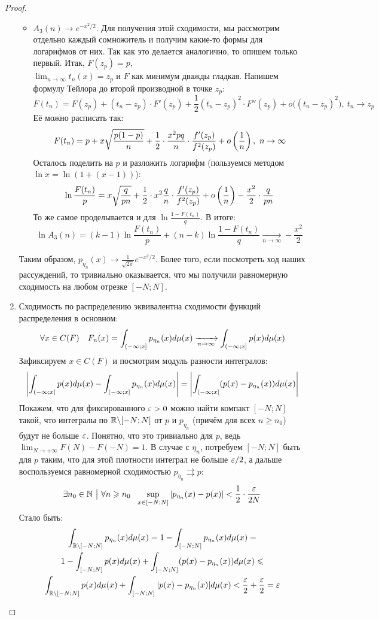 \begin{proof}
\begin{enumerate}
\begin{itemize}
			\item $A_3(n) \to e^{-x^2 / 2}$. Для получения этой сходимости, мы рассмотрим отдельно каждый сомножитель и получим какие-то формы для логарифмов от них. Так как это делается аналогично, то опишем только первый. Итак, $F(z_p) = p$,\\ $\lim_{n \to \infty} t_n(x) = z_p$ и $F$ как минимум дважды гладкая. Напишем формулу Тейлора до второй производной в точке $z_p$:
			\[
				F(t_n) = F(z_p) + (t_n - z_p) \cdot F'(z_p) + \frac{1}{2}(t_n - z_p)^2 \cdot F''(z_p) + o\big((t_n - z_p)^2\big),\ t_n \to z_p
			\]
			Её можно расписать так:
			\[
				F(t_n) = p + x\sqrt{\frac{p(1 - p)}{n}} + \frac{1}{2} \cdot \frac{x^2pq}{n} \cdot \frac{f'(z_p)}{f^2(z_p)} + o\left(\frac{1}{n}\right),\ n \to \infty
			\]
			Осталось поделить на $p$ и разложить логарифм (пользуемся методом $\ln x = \ln(1 + (x - 1))$):
			\[
				\ln \frac{F(t_n)}{p} = x\sqrt{\frac{q}{pn}} + \frac{1}{2} \cdot x^2\frac{q}{n} \cdot \frac{f'(z_p)}{f^2(z_p)} + o\left(\frac{1}{n}\right) - \frac{x^2}{2} \cdot \frac{q}{pn}
			\]
			То же самое проделывается и для $\ln \frac{1 - F(t_n)}{q}$. В итоге:
			\[
				\ln A_3(n) = (k - 1)\ln \frac{F(t_n)}{p} + (n - k)\ln \frac{1 - F(t_n)}{q} \xrightarrow[n \to \infty]{} -\frac{x^2}{2}
			\]
		\end{itemize}
		Таким образом, $p_{\eta_n}(x) \to \frac{1}{\sqrt{2\pi}} e^{-x^2 / 2}$. Более того, если посмотреть ход наших рассуждений, то тривиально оказывается, что мы получили равномерную сходимость на любом отрезке $[-N; N]$.
		
		\item Сходимость по распределению эквивалентна сходимости функций распределения в основном:
		\[
			\forall x \in C(F)\quad F_n(x) = \int_{\left(-\infty; x\right]} p_{\eta_n}(x)d\mu(x) \xrightarrow[n \to \infty]{} \int_{\left(-\infty; x\right]} p(x)d\mu(x)
		\]
		Зафиксируем $x \in C(F)$ и посмотрим модуль разности интегралов:
		\[
			\left|\int_{\left(-\infty; x\right]} p(x)d\mu(x) - \int_{\left(-\infty; x\right]} p_{\eta_n}(x)d\mu(x)\right| = \left|\int_{\left(-\infty; x\right]} (p(x) - p_{\eta_n}(x))d\mu(x)\right|
		\]
		Покажем, что для фиксированного $\varepsilon > 0$ можно найти компакт $[-N; N]$ такой, что интегралы по $\mathbb{R} \backslash [-N; N]$ от $p$ и $p_{\eta_n}$ (причём для всех $n \ge n_0$) будут не больше $\varepsilon$. Понятно, что это тривиально для $p$, ведь $\lim_{N \to +\infty} F(N) - F(-N) = 1$. В случае с $\eta_n$, потребуем $[-N; N]$ быть для $p$ таким, что для этой плотности интеграл не больше $\varepsilon / 2$, а дальше воспользуемся равномерной сходимостью $p_{\eta_n} \rightrightarrows p$:
		\[
			\exists n_0 \in \N \such \forall n \ge n_0\ \ \sup_{x \in [-N; N]} |p_{\eta_n}(x) - p(x)| < \frac{1}{2} \cdot \frac{\eps}{2N}
		\]
		Стало быть:
		\begin{multline*}
			\int_{\mathbb{R} \backslash [-N; N]} p_{\eta_n}(x)d\mu(x) = 1 - \int_{[-N; N]} p_{\eta_n}(x)d\mu(x) =
			\\
			1 - \int_{[-N; N]} p(x)d\mu(x) + \int_{[-N; N]} (p(x) - p_{\eta_n}(x))d\mu(x) \leqslant
			\\
			\int_{\mathbb{R} \backslash [-N; N]} p(x)d\mu(x) + \int_{[-N; N]} |p(x) - p_{\eta_n}(x)|d\mu(x) < \frac{\varepsilon}{2} + \frac{\varepsilon}{2} = \varepsilon
		\end{multline*}
		

\end{enumerate}
\end{proof}
